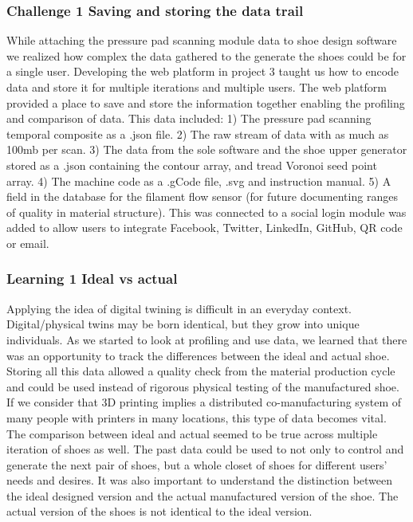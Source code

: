 \subsubsection{Challenge 1 Saving and storing the data trail}

While attaching the pressure pad scanning module data to shoe design software we realized how complex the data gathered to the generate the shoes could be for a single user. Developing the web platform in project 3 taught us how to encode data and store it for multiple iterations and multiple users. The web platform provided a place to save and store the information together enabling the profiling and comparison of data.
This data included: 1) The pressure pad scanning temporal composite as a .json file. 2) The raw stream of data with as much as 100mb per scan. 3) The data from the sole software and the shoe upper generator stored as a .json containing the contour array, and tread Voronoi seed point array. 4) The machine code as  a .gCode file, .svg and instruction manual. 5) A field in the database for the filament flow sensor (for future documenting ranges of quality in material structure). This was connected to a social login module was added to allow users to integrate Facebook, Twitter, LinkedIn, GitHub, QR code or email. 


\subsubsection{Learning 1 Ideal vs actual}

Applying the idea of digital twining is difficult in an everyday context. Digital/physical twins may be born identical, but they grow into unique individuals. As we started to look at profiling and use data, we learned that there was an opportunity to track the differences between the ideal and actual shoe. Storing all this data allowed a quality check from the material production cycle and could be used instead of rigorous physical testing of the manufactured shoe. If we consider that 3D printing implies a distributed co-manufacturing \cite{Nachtigall2019} system of many people with printers in many locations, this type of data becomes vital. The comparison between ideal and actual seemed to be true across multiple iteration of shoes as well. The past data could be used to not only to control and generate the next pair of shoes, but a whole closet of shoes for different users' needs and desires. It was also important to understand the distinction between the ideal designed version and the actual manufactured version of the shoe. The actual version of the shoes is not identical to the ideal version.  

